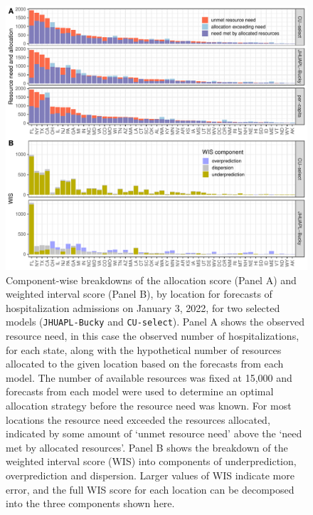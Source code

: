 \documentclass{article}\usepackage[]{graphicx}\usepackage[]{xcolor}
\makeatletter
\def\maxwidth{ %
  \ifdim\Gin@nat@width>\linewidth
    \linewidth
  \else
    \Gin@nat@width
  \fi
}
\newenvironment{knitrout}{}{} %
\makeatother
\begin{document}
\begin{knitrout}
\color{fgcolor}\begin{figure}
\includegraphics[width=\maxwidth]{figure/multi-loc-ranks-1} \caption[Component-wise breakdowns of the allocation score (Panel A) and weighted interval score (Panel B), by location for forecasts of hospitalization admissions on January 3, 2022, for two selected models (\texttt{JHUAPL-Bucky} and \texttt{CU-select})]{Component-wise breakdowns of the allocation score (Panel A) and weighted interval score (Panel B), by location for forecasts of hospitalization admissions on January 3, 2022, for two selected models (\texttt{JHUAPL-Bucky} and \texttt{CU-select}). Panel A shows the observed resource need, in this case the observed number of hospitalizations, for each state, along with the hypothetical number of resources allocated to the given location based on the forecasts from each model. The number of available resources was fixed at 15,000 and forecasts from each model were used to determine an optimal allocation strategy before the resource need was known. For most locations the resource need exceeded the resources allocated, indicated by some amount of `unmet resource need' above the `need met by allocated resources'. Panel B shows the breakdown of the weighted interval score (WIS) into components of underprediction, overprediction and dispersion. Larger values of WIS indicate more error, and the full WIS score for each location can be decomposed into the three components shown here.}\label{fig:multi-loc-ranks}
\end{figure}

\end{knitrout}
\end{document}
